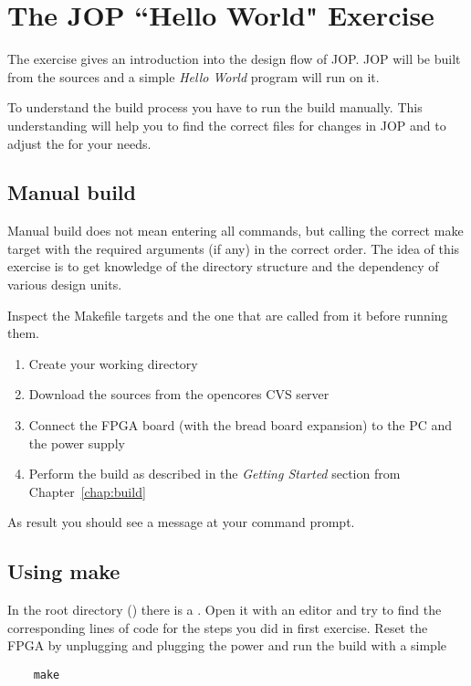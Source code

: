 \section{The JOP ``Hello World" Exercise}

The exercise gives an introduction into the design flow of JOP. JOP
will be built from the sources and a simple \emph{Hello World}
program will run on it.

To understand the build process you have to run the build manually.
This understanding will help you to find the correct files for
changes in JOP and to adjust the  for your needs.

\subsection{Manual build}

Manual build does not mean entering all commands, but calling the
correct make target with the required arguments (if any) in the
correct order. The idea of this exercise is to get knowledge of the
directory structure and the dependency of various design units.

Inspect the Makefile targets and the one that are called from it
before running them.

\begin{enumerate}
    \item Create your working directory
    \item Download the sources from the opencores CVS server
    \item Connect the FPGA board (with the bread board expansion) to the PC and the power supply
    \item Perform the build as described in the \emph{Getting Started} section
    from Chapter~\ref{chap:build}
\end{enumerate}

As result you should see a message at your command prompt.

\subsection{Using make}

In the root directory () there is a . Open
it with an editor and try to find the corresponding lines of code
for the steps you did in first exercise. Reset the FPGA by
unplugging and plugging the power and run the build with a simple
\begin{verbatim}
    make
\end{verbatim}

